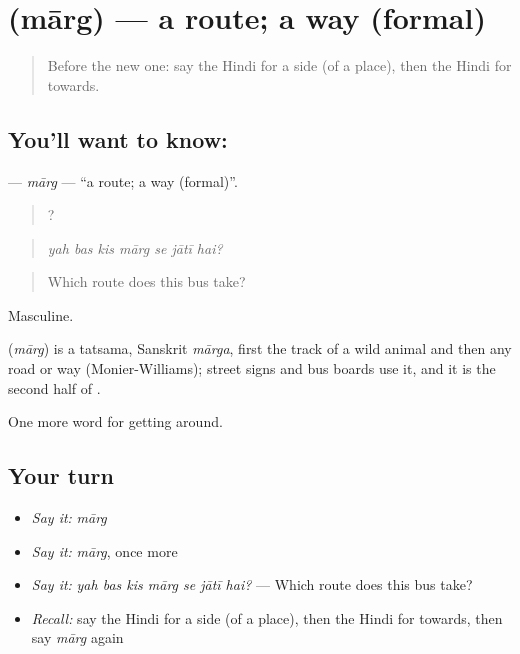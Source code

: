 \section[\texorpdfstring{\hi{मार्ग} (mārg)}{मार्ग (mārg)}]{ (mārg) — a route; a way (formal)}

\label{lesson:HI-C417-marg}



\begin{quote}
Before the new one: say the Hindi for a side (of a place), then the Hindi for towards.
\end{quote}

\subsection*{You'll want to know: }
\textbf{} — \emph{mārg} — \textquotedblleft{}a route; a way (formal)\textquotedblright{}.

\begin{quote}
      ?
\end{quote}

\begin{quote}
\emph{yah bas kis mārg se jātī hai?}
\end{quote}

\begin{quote}
Which route does this bus take?
\end{quote}

Masculine.

\begin{cousinweb}
\textbf{} (\emph{mārg}) is a tatsama, Sanskrit \emph{mārga}, first the track of a wild animal and then any road or way (Monier-Williams); street signs and bus boards use it, and it is the second half of .
\end{cousinweb}

\begin{grammarlens}[title={What you've built}]
One more word for getting around.
\end{grammarlens}

\subsection*{Your turn}
\begin{itemize}
\raggedright
  \item \emph{Say it:} \emph{mārg}
  \item \emph{Say it:} \emph{mārg}, once more
  \item \emph{Say it:} \emph{yah bas kis mārg se jātī hai?} — Which route does this bus take?
  \item \emph{Recall:} say the Hindi for a side (of a place), then the Hindi for towards, then say \emph{mārg} again
\end{itemize}

